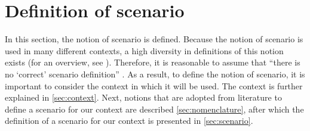 \cbstart
\section{Definition of scenario}
\label{sec:definition scenario}

In this section, the notion of scenario is defined. Because the notion of scenario is used in many different contexts, a high diversity in definitions of this notion exists (for an overview, see \cite{vannotten2003updated, bishop2007scentechniques}). Therefore, it is reasonable to assume that ``there is no `correct' scenario definition'' \cite{vannotten2003updated}. As a result, to define the notion of scenario, it is important to consider the context in which it will be used. The context is further explained in \cref{sec:context}. Next, notions that are adopted from literature to define a scenario for our context are described \cref{sec:nomenclature}, after which the definition of a scenario for our context is presented in \cref{sec:scenario}.
\cbend


